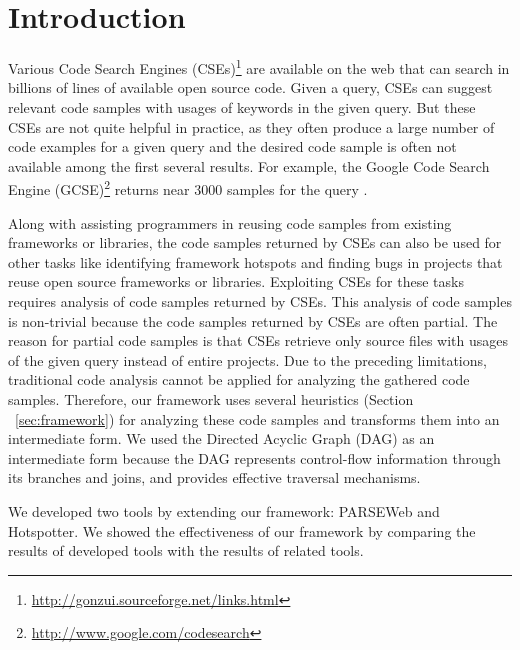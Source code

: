 \section{Introduction}
\label{sec:intro}

Various Code Search Engines (CSEs)\footnote{\url{http://gonzui.sourceforge.net/links.html}}
are available on the web that can search in billions of lines of available open source code. 
 Given a query, CSEs 
can suggest relevant code samples with usages of keywords in the given query. But these CSEs
are not quite helpful in practice, as they often produce a large number of code
examples for a given query and the desired code sample is often not available 
among the first several results. For example, the Google Code Search Engine
(GCSE)\footnote{\url{http://www.google.com/codesearch}} 
returns near 3000 samples for the query .

Along with assisting programmers in reusing code samples
from existing frameworks or libraries, the code samples 
returned by CSEs can also be used for other tasks 
like identifying framework hotspots and finding bugs in projects 
that reuse open source frameworks or libraries. 
Exploiting CSEs for these tasks requires analysis of 
code samples returned by CSEs. This analysis of code samples 
is non-trivial because the code samples returned by CSEs are often partial. 
The reason for partial code samples is that CSEs retrieve 
only source files with usages of the given query instead of entire projects. 
Due to the preceding limitations, traditional code analysis cannot be applied 
for analyzing the gathered code samples. Therefore, our framework 
uses several heuristics (Section ~\ref{sec:framework}) 
for analyzing these code samples and transforms them into 
an intermediate form. We used the Directed Acyclic Graph
(DAG) as an intermediate form because the DAG represents control-flow information
through its branches and joins, and provides effective traversal mechanisms. 

We developed two tools by extending our framework: PARSEWeb
and Hotspotter. We showed the effectiveness of our framework by comparing the results 
of developed tools with the results of related tools.
